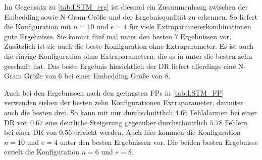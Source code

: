     Im Gegensatz zu \autoref{tab:LSTM_erg} ist diesmal ein Zusammenhang zwischen der Embedding sowie N-Gram-Größe und der Ergebnisqualität zu erkennen.
    So liefert die Konfiguration mit $n=10$ und $e=4$ für viele Extraparameterkombinationen gute Ergebnisse.
    Sie kommt fünf mal unter den besten $7$ Ergebnissen vor.
    Zusätzlich ist sie auch die beste Konfiguration ohne Extraparameter.
    Es ist auch die einzige Konfiguration ohne Extraparametern, die es in unter die besten zehn geschafft hat.
    Das beste Ergebnis hinsichtlich der \ac{DR} liefert allerdings eine N-Gram Größe von $6$ bei einer Embedding Größe von $8$.\par\medskip

    Auch bei den Ergebnissen nach den geringsten \acp{FP} in \autoref{tab:LSTM_FP} verwenden sieben der besten zehn Konfigurationen Extraparameter, darunter auch die besten drei.
    So kann mit nur durchschnittlich $4.66$ Fehlalarmen bei einer \ac{DR} von $0.67$ eine deutliche Steigerung gegenüber durchschnittlich $5.78$ Fehlern bei einer \ac{DR} von $0.56$  erreicht werden.
    Auch hier kommen die Konfiguration $n=10$ und $e=4$ unter den besten Ergebnissen vor.
    Die beiden besten Ergebnisse erzielt die Konfiguration $n=6$ und $e=8$.

